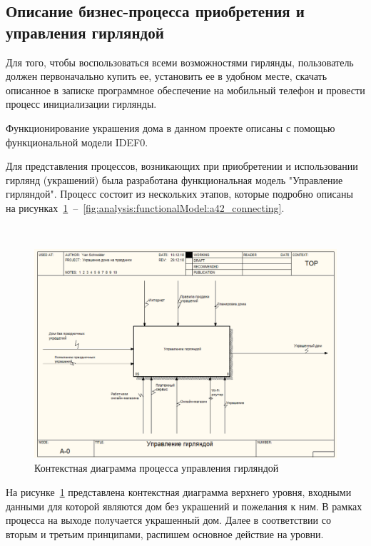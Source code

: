 \subsection{Описание бизнес-процесса приобретения и управления гирляндой}
\label{sec:analysis:businessProccess}

Для того, чтобы воспользоваться всеми возможностями гирлянды, пользователь должен первоначально купить ее, установить ее в удобном месте, скачать описанное в записке программное обеспечение на мобильный телефон и провести процесс инициализации гирлянды.

Функционирование украшения дома в данном проекте описаны с помощью функциональной модели IDEF0.

Для представления процессов, возникающих при приобретении и использовании гирлянд (украшений) была разработана функциональная модель "Управление гирляндой". Процесс состоит из нескольких этапов, которые подробно описаны на рисунках~\ref{fig:analysis:functionalModel:main}~–~\ref{fig:analysis:functionalModel:a42_connecting}.

~
\begin{figure}[H]
\centering
	\includegraphics[scale=0.45]{figures/functionalModel/main.jpg}
	\caption{Контекстная диаграмма процесса управления гирляндой}
	\label{fig:analysis:functionalModel:main}
\end{figure}

На рисунке~\ref{fig:analysis:functionalModel:main} представлена контекстная диаграмма верхнего уровня, входными данными для которой являются дом без украшений и пожелания к ним. В рамках процесса на выходе получается украшенный дом. Далее в соответствии со вторым и третьим принципами, распишем основное действие на уровни.

